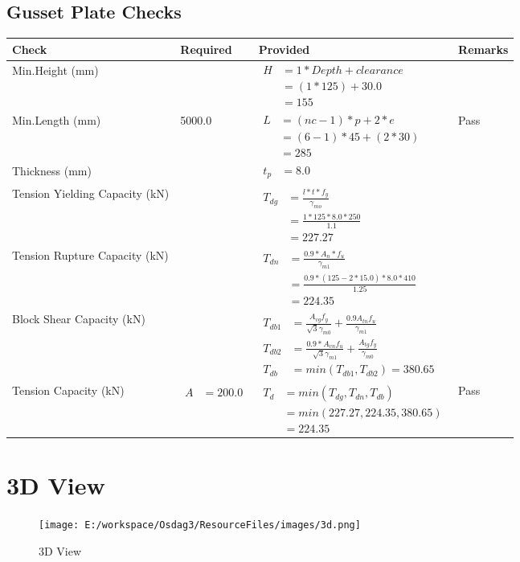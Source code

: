 \documentclass{article}%
\begin{document}
%
\newpage%
\subsection{Gusset Plate Checks}%
\label{subsec:GussetPlateChecks}%
\renewcommand{\arraystretch}{1.2}%
\begin{longtable}{|p{2.5cm}|p{5cm}|p{7.5cm}|p{1cm}|}%
\hline%
\rowcolor{OsdagGreen}%
Check&Required&Provided&Remarks\\%
\hline%
\endhead%
\hline%
Min.Height (mm)&&$\begin{aligned} H &= 1* Depth + clearance \\ &=(1*125)+30.0\\ &= 155\end{aligned}$&\\%
\hline%
Min.Length (mm)&5000.0&$\begin{aligned} L &= (nc -1) * p + 2 * e\\ &= (6-1) *45+ (2 *30)\\ &= 285\end{aligned}$&Pass\\%
\hline%
Thickness (mm)&&$\begin{aligned} t_p &=8.0\end{aligned}$&\\%
\hline%
Tension Yielding Capacity (kN)&&$\begin{aligned} T_{dg} &= \frac{l*t*f_y}{\gamma_{mo}}\\ &=\frac{1*125*8.0*250}{1.1}\\ &=227.27\end{aligned}$&\\%
\hline%
Tension Rupture Capacity (kN)&&$\begin{aligned} T_{dn} &= \frac{0.9*A_{n}*f_u}{\gamma_{m1}}\\ &=\frac{0.9*(125-2*15.0)*8.0*410}{1.25}\\ &=224.35\end{aligned}$&\\%
\hline%
Block Shear Capacity (kN)&&$\begin{aligned}T_{db1} &= \frac{A_{vg} f_{y}}{\sqrt{3} \gamma_{m0}} + \frac{0.9 A_{tn} f_{u}}{\gamma_{m1}}\\ T_{db2} &= \frac{0.9*A_{vn} f_{u}}{\sqrt{3} \gamma_{m1}} + \frac{A_{tg} f_{y}}{\gamma_{m0}}\\ T_{db} &= min(T_{db1}, T_{db2})= 380.65\end{aligned}$&\\%
\hline%
Tension Capacity (kN)&$\begin{aligned} A &=200.0\end{aligned}$&$\begin{aligned} T_d &= min(T_{dg},T_{dn},T_{db})\\ &= min(227.27,224.35,380.65)\\ &=224.35\end{aligned}$&Pass\\%
\hline%
\end{longtable}

%
%
\newpage%
\section{3D View}%
\label{sec:3DView}%


\begin{figure}[h!]%
\centering%
\texttt{[image: E:/workspace/Osdag3/ResourceFiles/images/3d.png]}%
\caption{3D View}%
\end{figure}

%
\end{document}
